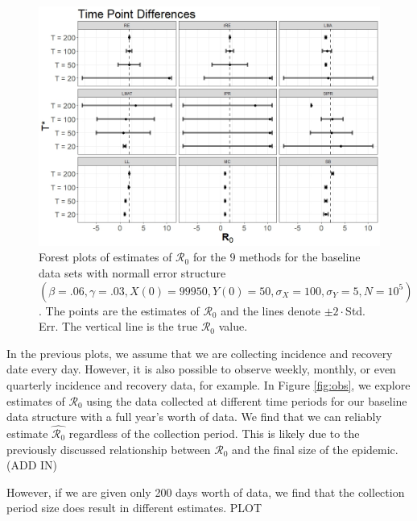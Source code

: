 \documentclass[12pt]{article}
\newcommand{\xxsir}{\ensuremath{9} } %
\newcommand{\rr}{\ensuremath{\mathcal{R}_0}}
\begin{document}
\begin{figure}[H]
	\centering
	\includegraphics[scale=0.5]{images/timediff.jpeg}
	\caption{Forest plots of estimates of $\rr$ for the \xxsir methods for the baseline data sets with normall error structure $(\beta=.06, \gamma=.03, X(0) = 99950, Y(0)=50, \sigma_X=100, \sigma_Y=5, N=10^5)$.  The points are the estimates of $\rr$ and the lines denote $\pm 2\cdot $Std. Err.  The vertical line is the true $\rr$ value.}\label{fig:timediff}
      \end{figure}

      In the previous plots, we assume that we are collecting incidence and recovery date every day.  However, it is also possible to observe weekly, monthly, or even quarterly incidence and recovery data, for example.  In Figure \ref{fig:obs}, we explore estimates of $\rr$ using the data collected at different time periods for our baseline data structure with a full year's worth of data.  We find that we can reliably estimate $\hat{\rr}$ regardless of the collection period.  This is likely due to the previously discussed relationship between $\rr$ and the final size of the epidemic.  (ADD IN)

However, if we are given only 200 days worth of data, we find that the collection period size does result in different estimates.  PLOT      
      
\end{document}
